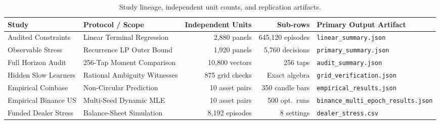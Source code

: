 \begin{table}[htbp]
\centering\small
\caption{Study lineage, independent unit counts, and replication artifacts.}
\label{tab:T2_lineage}
\begin{tabular}{llrrl}
\toprule
Study & Protocol / Scope & Independent Units & Sub-rows & Primary Output Artifact \\
\midrule
Audited Constraints & Linear Terminal Regression & 2,880 panels & 645,120 episodes & \texttt{linear\_summary.json} \\
Observable Stress & Recurrence LP Outer Bound & 1,920 panels & 5,760 decisions & \texttt{primary\_summary.json} \\
Full Horizon Audit & 256-Tap Moment Comparison & 10,800 vectors & 256 taps & \texttt{audit\_summary.json} \\
Hidden Slow Learners & Rational Ambiguity Witnesses & 875 grid checks & Exact algebra & \texttt{grid\_verification.json} \\
Empirical Coinbase & Non-Circular Prediction & 10 asset pairs & 350 candle bars & \texttt{empirical\_results.json} \\
Empirical Binance US & Multi-Seed Dynamic MLE & 10 asset pairs & 500 opt.\ runs & \texttt{binance\_multi\_epoch\_results.json} \\
Funded Dealer Stress & Balance-Sheet Simulation & 8,192 episodes & 8 settings & \texttt{dealer\_stress.csv} \\
\bottomrule
\end{tabular}
\end{table}
